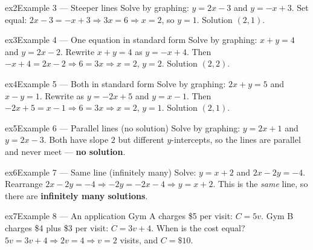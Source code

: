 \documentclass[11pt]{article}
\begin{document}
\begin{example}{ex2}{Example 3 --- Steeper lines}
Solve by graphing: $y=2x-3$ and $y=-x+3$.
\soln Set equal: $2x-3=-x+3\Rightarrow 3x=6\Rightarrow x=2$, so $y=1$. Solution $(2,1)$.
\end{example}

\begin{example}{ex3}{Example 4 --- One equation in standard form}
Solve by graphing: $x+y=4$ and $y=2x-2$.
\soln Rewrite $x+y=4$ as $y=-x+4$. Then $-x+4=2x-2\Rightarrow 6=3x\Rightarrow x=2$, $y=2$. Solution $(2,2)$.
\end{example}

\begin{example}{ex4}{Example 5 --- Both in standard form}
Solve by graphing: $2x+y=5$ and $x-y=1$.
\soln Rewrite as $y=-2x+5$ and $y=x-1$. Then $-2x+5=x-1\Rightarrow 6=3x\Rightarrow x=2$, $y=1$. Solution $(2,1)$.
\end{example}

\begin{example}{ex5}{Example 6 --- Parallel lines (no solution)}
Solve by graphing: $y=2x+1$ and $y=2x-3$.
\soln Both have slope $2$ but different $y$-intercepts, so the lines are parallel and never meet --- \textbf{no solution}.
\end{example}

\begin{example}{ex6}{Example 7 --- Same line (infinitely many)}
Solve: $y=x+2$ and $2x-2y=-4$.
\soln Rearrange $2x-2y=-4\Rightarrow -2y=-2x-4\Rightarrow y=x+2$. This is the \emph{same} line, so there are \textbf{infinitely many solutions}.
\end{example}

\begin{example}{ex7}{Example 8 --- An application}
Gym A charges \$5 per visit: $C=5v$. Gym B charges \$4 plus \$3 per visit: $C=3v+4$. When is the cost equal?
\soln $5v=3v+4\Rightarrow 2v=4\Rightarrow v=2$ visits, and $C=\$10$.
\end{example}
\end{document}
